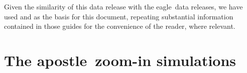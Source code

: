 \documentclass[10pt, a4paper]{article}
\newcommand{\eagle}{{\sc eagle}}
\newcommand{\apostle}{{\sc apostle}}
\begin{document}
\maketitle

\begin{abstract}
This manual accompanies the release of the group catalogs, merger trees and particle data for
the \apostle\ suite of cosmological hydrodynamical zoom-in simulations of galaxy
formation in Local Group-like regions. The galaxy formation model used in \apostle\
is closely related to that used in the \eagle\ project. We describe how to download
these data and how to extract information from them, emphasising differences relative
to the similar \eagle\ public data. The group catalogs are hosted on the same {\sc sql}
database as the equivalent from \eagle. We provide example routines for reading the
data, and some simple analyses, in {\sc python}.
\end{abstract}

Given the similarity of this data release with the \eagle\ data releases, we have used \citet{2016AnC....15...72M} and \citet{2017arXiv170609899T} as the basis for this document, repeating substantial information contained in those guides for the convenience of the reader, where relevant.

\section{The \apostle\ zoom-in simulations}
\end{document}
